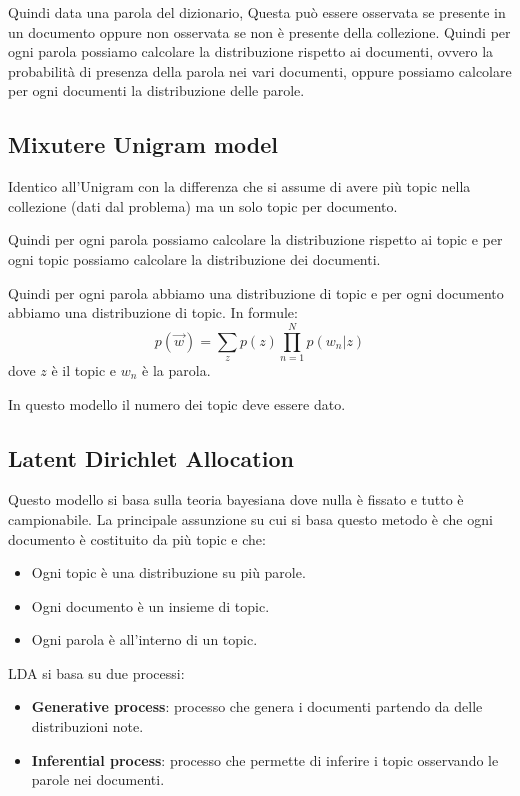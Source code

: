 Quindi data una parola del dizionario, Questa può essere osservata se presente
in un documento oppure non osservata se non è presente della collezione.
Quindi per ogni parola possiamo calcolare la distribuzione rispetto ai documenti,
ovvero la probabilità di presenza della parola nei vari documenti, oppure possiamo
calcolare per ogni documenti la distribuzione delle parole.

\subsection{Mixutere Unigram model}
Identico all'Unigram con la differenza che si assume di avere più topic nella collezione (dati dal problema) ma
un solo topic per documento.

Quindi per ogni parola possiamo calcolare la distribuzione rispetto ai topic e
per ogni topic possiamo calcolare la distribuzione dei documenti.

Quindi per ogni parola abbiamo una distribuzione di topic e per ogni documento
abbiamo una distribuzione di topic. In formule:
\begin{equation}
      p(\vec{w}) = \sum_z p(z) \prod_{n = 1}^{N} p(w_n|z)
\end{equation}
dove $z$ è il topic e $w_n$ è la parola.
\begin{nota}
      In questo modello il numero dei topic deve essere dato.
\end{nota}
\subsection{Latent Dirichlet Allocation}
Questo modello si basa sulla teoria bayesiana dove nulla è fissato e tutto è
campionabile. La principale assunzione su cui si basa questo metodo è che ogni
documento è costituito da più topic e che:
\begin{itemize}
      \item Ogni topic è una distribuzione su più parole.
      \item Ogni documento è un insieme di topic.
      \item Ogni parola è all'interno di un topic.
\end{itemize}
LDA si basa su due processi:
\begin{itemize}
      \item \textbf{Generative process}: processo che genera i documenti partendo
            da delle distribuzioni note.
      \item \textbf{Inferential process}: processo che permette di inferire i topic
            osservando le parole nei documenti.
\end{itemize}

